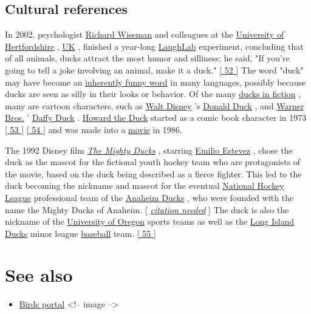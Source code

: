 \documentclass[11pt,a4paper]{article}
\begin{document}
\subsection{Cultural references}

In 2002, psychologist \href{/wiki/Richard\_Wiseman}{Richard Wiseman} and colleagues at the \href{/wiki/University\_of\_Hertfordshire}{University of Hertfordshire} , \href{/wiki/UK}{UK} , finished a year-long \href{/wiki/LaughLab}{LaughLab} experiment, concluding that of all animals, ducks attract the most humor and silliness; he said, "If you're going to tell a joke involving an animal, make it a duck." \href{\#cite\_note-52}{[ 52 ]} The word "duck" may have become an \href{/wiki/Inherently\_funny\_word}{inherently funny word} in many languages, possibly because ducks are seen as silly in their looks or behavior. Of the many \href{/wiki/List\_of\_fictional\_ducks}{ducks in fiction} , many are cartoon characters, such as \href{/wiki/The\_Walt\_Disney\_Company}{Walt Disney} 's \href{/wiki/Donald\_Duck}{Donald Duck} , and \href{/wiki/Warner\_Bros.}{Warner Bros.} ' \href{/wiki/Daffy\_Duck}{Daffy Duck} . \href{/wiki/Howard\_the\_Duck}{Howard the Duck} started as a comic book character in 1973 \href{\#cite\_note-53}{[ 53 ]} \href{\#cite\_note-54}{[ 54 ]} and was made into a \href{/wiki/Howard\_the\_Duck\_(film)}{movie} in 1986.

The 1992 Disney film \href{/wiki/The\_Mighty\_Ducks\_(film)}{\textit{The Mighty Ducks}} , starring \href{/wiki/Emilio\_Estevez}{Emilio Estevez} , chose the duck as the mascot for the fictional youth hockey team who are protagonists of the movie, based on the duck being described as a fierce fighter. This led to the duck becoming the nickname and mascot for the eventual \href{/wiki/National\_Hockey\_League}{National Hockey League} professional team of the \href{/wiki/Anaheim\_Ducks}{Anaheim Ducks} , who were founded with the name the Mighty Ducks of Anaheim. [ \href{/wiki/Wikipedia:Citation\_needed}{\textit{citation needed}} ] The duck is also the nickname of the \href{/wiki/University\_of\_Oregon}{University of Oregon} sports teams as well as the \href{/wiki/Long\_Island\_Ducks}{Long Island Ducks} minor league \href{/wiki/Baseball}{baseball} team. \href{\#cite\_note-55}{[ 55 ]}

\section{See also}

\begin{itemize}
\item \href{/wiki/Portal:Birds}{Birds portal}
<!-- image -->
\end{itemize}
\end{document}
